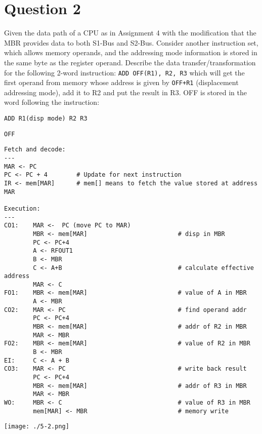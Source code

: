 \documentclass{article}
\begin{document}
\section*{Question 2}

Given the data path of a CPU as in Assignment 4 with the modification that the MBR provides data to both S1-Bus and S2-Bus. Consider another instruction set, which allows memory operands, and the addressing mode information is stored in the same byte as the register operand. Describe the data transfer/transformation for the following 2-word instruction: \texttt{ADD OFF(R1), R2, R3} which will get the first operand from memory whose address is given by \texttt{OFF+R1} (displacement addressing mode), add it to R2 and put the result in R3. OFF is stored in the word following the instruction:

\texttt{ADD R1(disp mode) R2 R3}

\texttt{OFF}

\begin{verbatim}
Fetch and decode:
---
MAR <- PC
PC <- PC + 4        # Update for next instruction
IR <- mem[MAR]      # mem[] means to fetch the value stored at address MAR

Execution:
---
CO1:    MAR <-  PC (move PC to MAR)
        MBR <- mem[MAR]                         # disp in MBR
        PC <- PC+4 
        A <- RFOUT1 
        B <- MBR 
        C <- A+B                                # calculate effective address
        MAR <- C 
FO1:    MBR <- mem[MAR]                         # value of A in MBR
        A <- MBR
CO2:    MAR <- PC                               # find operand addr
        PC <- PC+4
        MBR <- mem[MAR]                         # addr of R2 in MBR
        MAR <- MBR
FO2:    MBR <- mem[MAR]                         # value of R2 in MBR
        B <- MBR
EI:     C <- A + B
CO3:    MAR <- PC                               # write back result
        PC <- PC+4
        MBR <- mem[MAR]                         # addr of R3 in MBR
        MAR <- MBR
WO:     MBR <- C                                # value of R3 in MBR
        mem[MAR] <- MBR                         # memory write
\end{verbatim}


\texttt{[image: ./5-2.png]}
\end{document}
